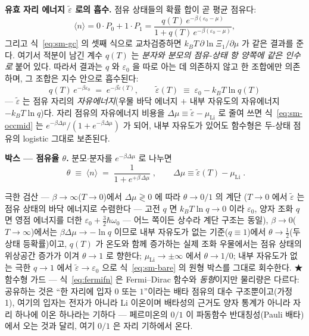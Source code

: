 \textbf{유효 자리 에너지 $\tilde\varepsilon$ 로의 흡수.} 점유 상태들의 확률 합이 곧 평균 점유다:
\begin{equation}
\langle n\rangle=0\cdot P_0+1\cdot P_1
=\frac{q(T)\,e^{-\beta(\varepsilon_0-\mu)}}{1+q(T)\,e^{-\beta(\varepsilon_0-\mu)}},
\label{eq:sm-occmid}
\end{equation}
그리고 식~\eqref{eq:sm-gc} 의 셋째 식으로 교차검증하면 $k_BT\,\partial\ln\Xi_1/\partial\mu$ 가 같은
결과를 준다. 여기서 적분이 남긴 계수 $q(T)$ 는 \emph{분자와 분모의 점유-상태 항 양쪽에 같은 인수로}
붙어 있다. 따라서 결과는 $q$ 와 $\varepsilon_0$ 을 따로 아는 데 의존하지 않고 한 조합에만 의존하며,
그 조합은 지수 안으로 흡수된다:
\begin{equation}
q(T)\,e^{-\beta\varepsilon_0}\;=\;e^{-\beta\tilde\varepsilon(T)},
\qquad
\tilde\varepsilon(T)\;\equiv\;\varepsilon_0-k_BT\ln q(T)
\label{eq:sm-epstilde}
\end{equation}
--- $\tilde\varepsilon$ 는 점유 자리의 \emph{자유에너지}(우물 바닥 에너지 $+$ 내부 자유도의 자유에너지
$-k_BT\ln q$)다. 자리 점유의 자유에너지 비용을 $\Delta\mu\equiv\tilde\varepsilon-\mu_\mathrm{Li}$ 로
줄여 쓰면 식~\eqref{eq:sm-occmid} 는 $e^{-\beta\Delta\mu}/(1+e^{-\beta\Delta\mu})$ 가 되어, 내부
자유도가 있어도 함수형은 두-상태 점유의 logistic 그대로 보존된다.

\textbf{박스 --- 점유율 $\theta$.} 분모$\cdot$분자를 $e^{-\beta\Delta\mu}$ 로 나누면
\begin{equation}
\boxed{\;\theta\;\equiv\;\langle n\rangle\;=\;\frac{1}{1+e^{+\beta\,\Delta\mu}}\;,
\qquad \Delta\mu\equiv\tilde\varepsilon(T)-\mu_\mathrm{Li}\;.}
\label{eq:fermifn}
\end{equation}
\begin{verifybox}
극한 검산 --- $\beta\to\infty$($T\to0$)에서 $\Delta\mu\gtrless0$ 에 따라 $\theta\to0/1$ 의 계단
($T\to0$ 에서 $\tilde\varepsilon$ 는 점유 상태의 바닥 에너지로 수렴한다 --- 고전 $q$ 면 $k_BT\ln q\to0$
이라 $\varepsilon_0$, 양자 조화 $q$ 면 영점 에너지를 더한 $\varepsilon_0+\tfrac32\hbar\omega_0$ --- 어느
쪽이든 상수라 계단 구조는 동일),
$\beta\to0$($T\to\infty$)에서는 $\beta\Delta\mu\to-\ln q$ 이므로 내부 자유도가 없는 기준($q\equiv1$)에서
$\theta\to\tfrac12$(두 상태 등확률)이고, $q(T)$ 가 온도와 함께 증가하는 실제 조화 우물에서는 점유 상태의
위상공간 증가가 이겨 $\theta\to1$ 로 향한다; $\mu_\mathrm{Li}\to\pm\infty$ 에서
$\theta\to1/0$; 내부 자유도가 없는 극한 $q\to1$ 에서 $\tilde\varepsilon\to\varepsilon_0$ 으로
식~\eqref{eq:sm-bare} 의 원형 박스를 그대로 회수한다. ★함수형 가드 --- 식~\eqref{eq:fermifn} 은
Fermi--Dirac 함수와 \emph{동형}이지만 물리량은 다르다: 공유하는 것은 ``한 자리에 입자 $0$ 또는 $1$''이라는
배타 점유의 대수 구조뿐이고(가정 1), 여기의 입자는 전자가 아니라 Li 이온이며 배타성의 근거도 양자 통계가
아니라 자리 하나에 이온 하나라는 기하다 --- 페르미온의 $0/1$ 이 파동함수 반대칭성(Pauli 배타)에서 오는
것과 달리, 여기 $0/1$ 은 자리 기하에서 온다.
\end{verifybox}

